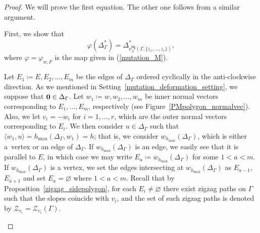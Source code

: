 \documentclass[pdftex]{sigma}%
\numberwithin{equation}{section}
\numberwithin{figure}{section}
\numberwithin{table}{section}
\newcommand{\calX}{\mathcal{X}}
\newcommand{\calZ}{\mathcal{Z}}
\newcommand{\zig}{\mathsf{zig}}
\begin{document}
\begin{proof}We will prove the first equation. The other one follows from a similar argument.

First, we show that
\begin{displaymath}
\varphi(\Delta_\Gamma^*)=\Delta_{\nu^\zig_\calX(\Gamma,\{z_1,\dots,z_r\})}^*,
\end{displaymath}
where $\varphi=\varphi_{w,F}$ is the map given in (\ref{mutation_M}).

Let $E_1\coloneqq E, E_2,\dots,E_m$ be the edges of $\Delta_\Gamma$ ordered cyclically in the anti-clockwise direction.
As we mentioned in Setting~\ref{mutation_deformation_setting}, we suppose that ${\bf 0}\in\Delta_\Gamma$.
Let $w_1\coloneqq w,w_2, \dots, w_m$ be inner normal vectors corresponding to $E_1,\dots,E_m$, respectively (see Figure~\ref{PMpolygon_normalvec}).
Also, we let $v_i=-w_i$ for $i=1,\dots,r$, which are the outer normal vectors corresponding to $E_i$.
We then consider $u\in\Delta_\Gamma$ such that $\langle w_1,u\rangle=h_{\max}(\Delta_\Gamma,w_1)=h$; that is, we consider $w_{h_{\max}}(\Delta_\Gamma)$, which is either a~vertex or an edge of $\Delta_\Gamma$.
If $w_{h_{\max}}(\Delta_\Gamma)$ is an edge, we easily see that it is parallel to $E$, in which case we may write $E_a\coloneqq w_{h_{\max}}(\Delta_\Gamma)$ for some $1<a<m$.
If $w_{h_{\max}}(\Delta_\Gamma)$ is a vertex, we set the edges intersecting at $w_{h_{\max}}(\Delta_\Gamma)$ as $E_{a-1}$, $E_{a+1}$ and set $E_a=\varnothing$ where $1<a<m$.
Recall that by Proposition~\ref{zigzag_sidepolygon}, for each $E_i\neq\varnothing$ there exist zigzag paths on $\Gamma$ such that the slopes coincide with $v_i$,
and the set of such zigzag paths is denoted by $\calZ_{v_i}=\calZ_{v_i}(\Gamma)$.

\begin{figure}[h!]\centering
{}
\end{figure}
\end{proof}
\end{document}
